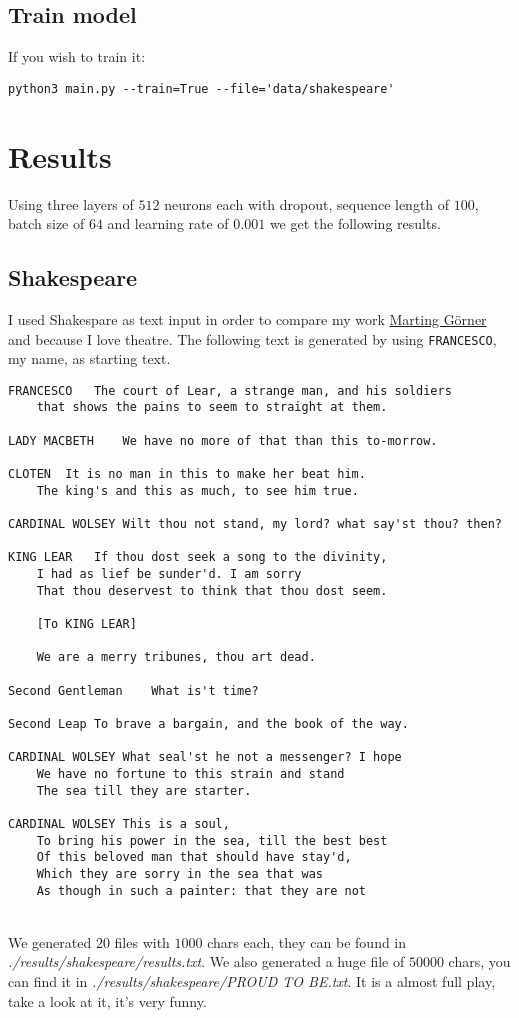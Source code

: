 \documentclass[11pt]{article}
\begin{document}
\subsection{Train model}
If you wish to train it:
\begin{lstlisting}[breaklines=true]
python3 main.py --train=True --file='data/shakespeare'	
\end{lstlisting}
\section{Results}
Using three layers of $512$ neurons each with dropout, sequence length of $100$, batch size of $64$ and learning rate of $0.001$ we get the following results.
\subsection{Shakespeare}
I used Shakespare as text input in order to compare my work \href{https://www.youtube.com/watch?v=vq2nnJ4g6N0}{Marting Görner} and because I love theatre. The following text is generated by using \texttt{FRANCESCO}, my name, as starting text. \\
\begin{lstlisting}[breaklines=true]
FRANCESCO	The court of Lear, a strange man, and his soldiers
	that shows the pains to seem to straight at them.

LADY MACBETH	We have no more of that than this to-morrow.

CLOTEN	It is no man in this to make her beat him.
	The king's and this as much, to see him true.

CARDINAL WOLSEY	Wilt thou not stand, my lord? what say'st thou? then?

KING LEAR	If thou dost seek a song to the divinity,
	I had as lief be sunder'd. I am sorry
	That thou deservest to think that thou dost seem.

	[To KING LEAR]

	We are a merry tribunes, thou art dead.

Second Gentleman	What is't time?

Second Leap	To brave a bargain, and the book of the way.

CARDINAL WOLSEY	What seal'st he not a messenger? I hope
	We have no fortune to this strain and stand
	The sea till they are starter.

CARDINAL WOLSEY	This is a soul,
	To bring his power in the sea, till the best best
	Of this beloved man that should have stay'd,
	Which they are sorry in the sea that was
	As though in such a painter: that they are not
\end{lstlisting}\\
We generated $20$ files with $1000$ chars each, they can be found in \emph{./results/shakespeare/results.txt}. We also generated a huge file of $50000$ chars, you can find it in \emph{./results/shakespeare/PROUD TO BE.txt}. It is a almost full play, take a look at it, it's very funny.
\end{document}
